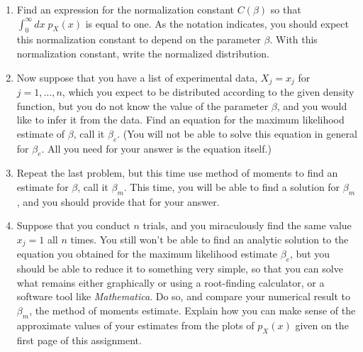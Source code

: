 \documentclass [12pt] {article}
\begin{document}
\begin{enumerate}

\item Find an expression for the normalization constant $C(\beta)$ so that $\int_0^\infty dx\; p_X(x)$ is equal to one.  As the notation indicates, you should expect this normalization constant to depend on the parameter $\beta$.  With this normalization constant, write the normalized distribution.

\item Now suppose that you have a list of experimental data, $X_j=x_j$ for $j=1,\ldots,n$, which you expect to be distributed according to the given density function, but you do not know the value of the parameter $\beta$, and you would like to infer it from the data.  Find an equation for the maximum likelihood estimate of $\beta$, call it $\beta_{e}$.  (You will not be able to solve this equation in general for $\beta_{e}$.  All you need for your answer is the equation itself.)

\item Repeat the last problem, but this time use method of moments to find an estimate for $\beta$, call it $\beta_{m}$.  This time, you will be able to find a solution for $\beta_{m}$, and you should provide that for your answer.

\item Suppose that you conduct $n$ trials, and you miraculously find the same value $x_j=1$ all $n$ times.  You still won't be able to find an analytic solution to the equation you obtained for the maximum likelihood estimate $\beta_e$, but you should be able to reduce it to something very simple, so that you can solve what remains either graphically or using a root-finding calculator, or a software tool like \textit{Mathematica}.  Do so, and compare your numerical result to $\beta_m$, the method of moments estimate.  Explain how you can make sense of the approximate values of your estimates from the plots of $p_X(x)$ given on the first page of this assignment.

\end{enumerate}
\end{document}
